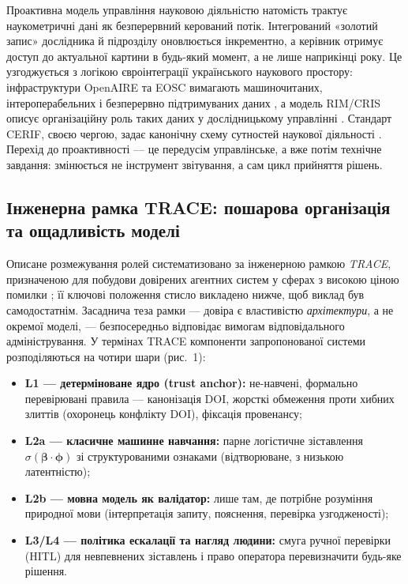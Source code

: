 Проактивна модель управління науковою діяльністю натомість трактує наукометричні дані як безперервний керований потік. Інтегрований «золотий запис» дослідника й підрозділу оновлюється інкрементно, а керівник отримує доступ до актуальної картини в будь-який момент, а не лише наприкінці року. Це узгоджується з логікою євроінтеграції українського наукового простору: інфраструктури OpenAIRE та EOSC вимагають машиночитаних, інтероперабельних і безперервно підтримуваних даних \cite{OpenAIRE2023GuidelinesCRIS}, а модель RIM/CRIS описує організаційну роль таких даних у дослідницькому управлінні \cite{Bryant2017RIMDefining}. Стандарт CERIF, своєю чергою, задає канонічну схему сутностей наукової діяльності \cite{euroCRIS2024CERIF}. Перехід до проактивності — це передусім управлінське, а вже потім технічне завдання: змінюється не інструмент звітування, а сам цикл прийняття рішень.

\subsection*{Інженерна рамка TRACE: пошарова організація та ощадливість моделі}

Описане розмежування ролей систематизовано за інженерною рамкою \emph{TRACE}, призначеною для побудови довірених агентних систем у сферах з високою ціною помилки \cite{Zabolotnii2026TRACE}; її ключові положення стисло викладено нижче, щоб виклад був самодостатнім. Засаднича теза рамки --- довіра є властивістю \emph{архітектури}, а не окремої моделі, --- безпосередньо відповідає вимогам відповідального адміністрування. У термінах TRACE компоненти запропонованої системи розподіляються на чотири шари (рис.~1):

\begin{itemize}
    \item \textbf{L1 --- детерміноване ядро (trust anchor):} не-навчені, формально перевірювані правила --- канонізація DOI, жорсткі обмеження проти хибних злиттів (охоронець конфлікту DOI), фіксація провенансу;
    \item \textbf{L2a --- класичне машинне навчання:} парне логістичне зіставлення $\sigma(\boldsymbol{\beta}\cdot\boldsymbol{\phi})$ зі структурованими ознаками (відтворюване, з низькою латентністю);
    \item \textbf{L2b --- мовна модель як валідатор:} лише там, де потрібне розуміння природної мови (інтерпретація запиту, пояснення, перевірка узгодженості);
    \item \textbf{L3/L4 --- політика ескалації та нагляд людини:} смуга ручної перевірки (HITL) для невпевнених зіставлень і право оператора перевизначити будь-яке рішення.
\end{itemize}

